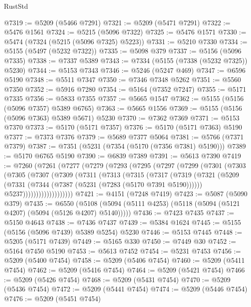 \begin{lexlean}{RustStd}
\begin{coremodule}
@7319 := @5209 (@5466 @7291)
@7321 := @5209 (@5471 @7291)
@7322 := @5476 @1561
@7324 := @5215 (@5096 @7322)
@7325 := @5476 @1571
@7330 := @5474 (@7324 (@5215 (@5096 @7325) @5223))
@7331 := @5210 @7330
@7334 := @5155 (@5497 (@5232 @7322))
@7335 := @5098 @379
@7337 := @5156 (@5096 @7335)
@7338 := @7337 @5389
@7343 := @7334 (@5155 (@7338 (@5232 @7325)) @5230)
@7344 := @5153 @7343
@7346 := @5246 (@5247 @469)
@7347 := @6596 @5190
@7348 := @5511 @7347
@7350 := @7346 @7348 @5262
@7351 := @5560 @7350
@7352 := @5916 @7280
@7354 := @5164 (@7352 @7247)
@7355 := @5171 @7335
@7356 := @5833 @7355
@7357 := @5665 @1547
@7362 := @5155 (@5156 (@5096 @7357) @5389 @6765)
@7363 := @5665 @1556
@7369 := @5155 (@5156 (@5096 @7363) @5389 @5671) @5230
@7370 := @7362 @7369
@7371 := @5153 @7370
@7373 := @5170 (@5171 @7357)
@7376 := @5170 (@5171 @7363) @5190
@7377 := @7373 @7376
@7379 := @5689 @7377 @5064
@7381 := @5766 (@7371 @7379)
@7387 := @7351 (@5231 (@7354 (@5170 (@7356 @7381) @5190)))
@7389 := @5170 @6765 @5190
@7390 := @6839 @7389
@7391 := @5613 @7390
@7419 := @7260
    (@7261
      (@7277
        (@7279
          (@7293
            (@7295
              (@7297
                (@7299
                  (@7301
                    (@7303
                      (@7305
                        (@7307
                          (@7309
                            (@7311
                              (@7313
                                (@7315
                                  (@7317
                                    (@7319
                                      (@7321
                                        (@5209
                                          (@7331
                                            (@7344 (@7387 (@5231 (@7283 (@5170 @7391 @5190))))))
                                          @5237)))))))))))))))))))
@7421 := @4151 (@7248 @7419)
@7423 := @5087 (@5090 @379)
@7435 := @6550
    (@5108 (@5094 (@5111 @4253) (@5118 (@5094 (@5121 @4207) (@5094 (@5126 @4207) @5140)))))
@7436 := @7423 @7435
@7437 := @5150 @4643
@7438 := @7436 @7437
@7439 := @5384 @1624
@7445 := @5155 (@5156 (@5096 @7439) @5389 @5254) @5230
@7446 := @5153 @7445
@7448 := @5205 (@5171 @7439)
@7449 := @5165 @330
@7450 := @7449 @30
@7452 := @5164 @7450 @5190
@7453 := @5613 @7452
@7454 := @5231 @7453
@7456 := @5209 (@5400 @7454)
@7458 := @5209 (@5406 @7454)
@7460 := @5209 (@5411 @7454)
@7462 := @5209 (@5416 @7454)
@7464 := @5209 (@5421 @7454)
@7466 := @5209 (@5426 @7454)
@7468 := @5209 (@5431 @7454)
@7470 := @5209 (@5436 @7454)
@7472 := @5209 (@5441 @7454)
@7474 := @5209 (@5446 @7454)
@7476 := @5209 (@5451 @7454)

\end{coremodule}
\end{lexlean}
